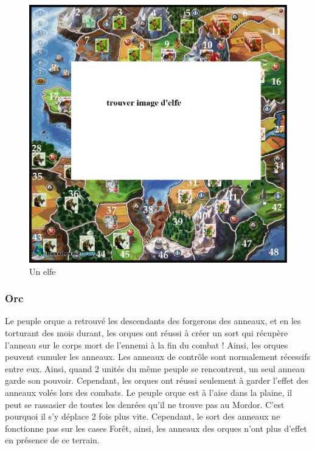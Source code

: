 \begin{figure}[!h]
\centering
\includegraphics[scale=0.10]{img/elf.jpg}
\caption{Un elfe}
\end{figure}

\subsubsection{Orc}

Le peuple orque a retrouvé les descendants des forgerons des anneaux, et en les torturant des mois durant, les orques ont réussi à créer un sort qui récupère l'anneau sur le corps mort de l'ennemi à la fin du combat ! Ainsi, les orques peuvent cumuler les anneaux.
\newline
\newline
Les anneaux de contrôle sont normalement récessifs entre eux. Ainsi, quand 2 unités du même peuple se rencontrent, un seul anneau garde son pouvoir. Cependant, les orques ont réussi seulement à garder l'effet des anneaux volés lors des combats.
\newline
\newline
Le peuple orque est à l'aise dans la plaine, il peut se rassasier de toutes les denrées qu'il ne trouve pas au Mordor. C'est pourquoi il s'y déplace 2 fois plus vite. 
\newline Cependant, le sort des anneaux ne fonctionne pas sur les cases Forêt, ainsi, les anneaux des orques n'ont plus d'effet en présence de ce terrain.

